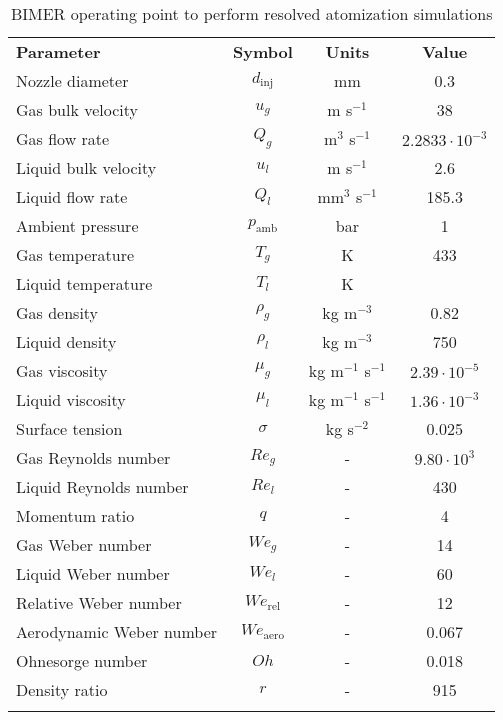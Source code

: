 \begin{table}[!h]
\centering
\caption{BIMER operating point to perform resolved atomization simulations}
\begin{tabular}{lccc}
\thickhline
\textbf{Parameter} & \textbf{Symbol} & \textbf{Units} &  \textbf{Value} \\
\thickhline
Nozzle diameter & $d_\mathrm{inj}$ & mm & 0.3 \\
Gas bulk velocity & $u_g$ & m s$^{-1}$ & 38 \\
Gas flow rate & $Q_g$ & m$^3$ s$^{-1}$ & $2.2833 \cdot 10^{-3}$   \\
Liquid bulk velocity & $u_l$ & m s$^{-1}$ & 2.6  \\
Liquid flow rate & $Q_l$ & mm$^3$ s$^{-1}$ & 185.3  \\
Ambient pressure & $p_\mathrm{amb}$ & bar &  1 \\
Gas temperature & $T_g$ & K & 433 \\
Liquid temperature & $T_l$ & K &  \\
Gas density & $\rho_g$ & kg m$^{-3}$ & 0.82 \\
Liquid density & $\rho_l$ & kg m$^{-3}$ & 750 \\
Gas viscosity & $\mu_g$ & kg m$^{-1}$ s$^{-1}$ & $2.39 \cdot 10^{-5}$ \\
Liquid viscosity & $\mu_l$ & kg m$^{-1}$ s$^{-1}$ &  $1.36 \cdot 10^{-3}$ \\
Surface tension & $\sigma$ & kg s$^{-2}$ &  0.025  \\
\thickhline
Gas Reynolds number & $Re_g$ & - & $9.80 \cdot 10^3$ \\
Liquid Reynolds number & $Re_l$ & - & 430 \\
Momentum ratio & $q$ & - & 4  \\
Gas Weber number & $We_g$ & - & 14 \\
Liquid Weber number & $We_l$ & - & 60 \\
Relative Weber number & $We_\mathrm{rel}$ & - & 12 \\
Aerodynamic Weber number & $We_\mathrm{aero}$ & - & 0.067 \\
Ohnesorge number & $Oh $ & - & 0.018 \\
Density ratio & $r$ & - & 915 \\
\thickhline
\end{tabular}
\label{tab:bimer_sps_operating_point}
\end{table}

